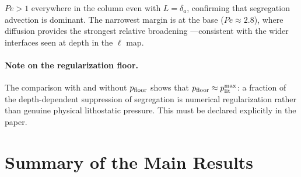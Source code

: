 \documentclass[12pt, a4paper]{article}
\begin{document}
$Pe > 1$ everywhere in the column even with $L = \delta_a$, confirming
that segregation advection is dominant. The narrowest margin is at the
base ($Pe \approx 2.8$), where diffusion provides the strongest
relative broadening ---consistent with the wider interfaces seen at
depth in the $\ell$ map.

\paragraph{Note on the regularization floor.}
The comparison with and without $p_{\rm floor}$ shows that
$p_{\rm floor} \approx p_{\rm lit}^{\rm max}$: a fraction of the
depth-dependent suppression of segregation is numerical regularization
rather than genuine physical lithostatic pressure. This must be
declared explicitly in the paper.

\newpage
\section{Summary of the Main Results}
\end{document}

